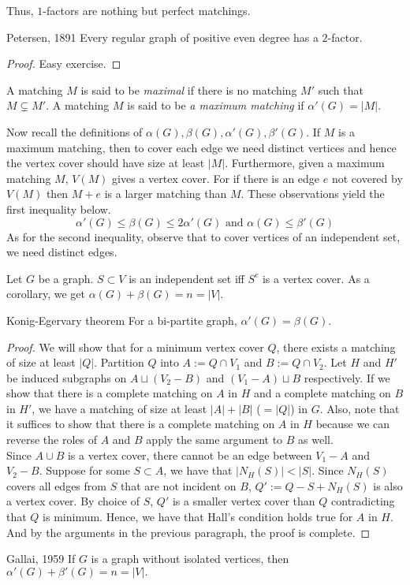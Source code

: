\documentclass[../basic_graph_theory.tex]{subfiles}
\begin{document}
Thus, $1$-factors are nothing but perfect matchings.

\begin{Thm}{Petersen, 1891}{}
    Every regular graph of positive even degree has a $2$-factor.
\end{Thm}
\begin{proof}
    Easy exercise.
\end{proof}

A matching $M$ is said to be {\em maximal} if there is no matching $M'$ such that $M \subsetneq M'$.  A matching $M$ is said to be {\em a maximum matching} if $\alpha'(G) = |M|$.

Now recall the definitions of $\alpha(G), \beta(G), \alpha'(G), \beta'(G)$. If $M$ is a maximum matching, then to cover each edge we need distinct vertices and hence the vertex cover should have size at least $|M|$.  Furthermore,  given a maximum matching $M$,   $V(M)$ gives a vertex cover.   For if there is an edge $e$ not covered by $V(M)$ then $M+e$ is a larger matching than $M$.  These observations yield the first inequality below.
\[
    \alpha'(G) \leq  \beta(G) \leq 2 \alpha'(G) \text{ and } \alpha(G) \leq \beta'(G)
\]
As for the second inequality, observe that to cover vertices of an independent set, we need distinct edges.

\begin{lem}
    Let $G$ be a graph. $S \subset V$ is an independent set iff $S^c$ is a vertex cover. As a corollary, we get $\alpha(G) + \beta(G) = n = |V|.$
\end{lem}
\begin{Thm}{Konig-Egervary theorem}{}
    For a bi-partite graph, $\alpha'(G) = \beta(G)$.
\end{Thm}
\begin{proof}
    We will show that for a minimum vertex cover $Q$, there exists a matching of size at least $|Q|$. Partition $Q$ into $A := Q \cap V_1$ and $B := Q \cap V_2$. Let $H$ and $H'$ be induced subgraphs on $A \sqcup (V_2 - B)$ and $(V_1 - A) \sqcup B$ respectively. If we show that there is a complete matching on $A$ in $H$ and a complete matching on $B$ in $H'$, we have a matching of size at least $|A| + |B|$ ($= |Q|$) in $G$.  Also, note that it suffices to show that there is a complete matching on $A$ in $H$ because we can reverse the roles of $A$ and $B$ apply the same argument to $B$ as well. \\
    Since $A \cup B$ is a vertex cover, there cannot be an edge between $V_1 - A$ and $V_2 - B$. Suppose for some $S \subset A$, we have that $|N_H(S)| < |S|$. Since $N_H(S)$ covers all edges from $S$ that are not incident on $B$, $Q' := Q - S + N_H(S)$ is also a vertex cover. By choice of $S$, $Q'$ is a smaller vertex cover than $Q$ contradicting that $Q$ is minimum.  Hence, we have that Hall's condition holds true for $A$ in $H$. And by the arguments in the previous paragraph, the proof is complete.
\end{proof}
\begin{Thm}{Gallai, 1959}{}
    If $G$ is a graph without isolated vertices, then $\alpha'(G) + \beta'(G) = n = |V|.$
\end{Thm}
\end{document}

